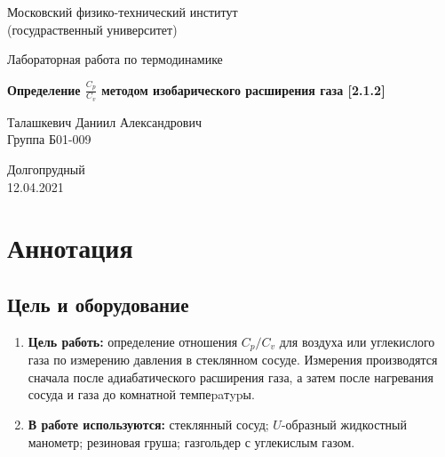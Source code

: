 \documentclass[a4paper,11.5pt]{article} %
\begin{document}


\begin{titlepage}

	\newpage
	\begin{center}
		\normalsize Московский физико-технический институт \\(госудраственный 			университет)
	\end{center}

	\vspace{6em}

	\begin{center}
		\Large Лабораторная работа по термодинамике\\
	\end{center}

	\vspace{1em}

	\begin{center}
		\large  \textbf{Определение $\frac{C_p}{C_v}$ методом изобарического расширения газа [2.1.2]}
	\end{center}

	\vspace{2em}

	\begin{center}
		\large Талашкевич Даниил Александрович\\
		Группа Б01-009
	\end{center}

	\vspace{\fill}

	\begin{center}
	Долгопрудный \\12.04.2021
	\end{center}
	
\end{titlepage}



	\thispagestyle{empty}
	\newpage
	\tableofcontents
	\newpage
	\setcounter{page}{1}


\section{Аннотация}

\subsection{Цель и оборудование}
\begin{enumerate}
\item \textbf{Цель работь:} определение отношения $C_{p} / C_{v}$ для воздуха или углекислого газа по измерению давления в стеклянном сосуде. Измерения производятся сначала после адиабатического расширения газа, а затем после нагревания сосуда и газа до комнатной темпеpaтypы.

\item \textbf{В работе используются:} стеклянный сосуд; $U$-образный жидкостный манометр; резиновая груша; газгольдер с углекислым газом.
\end{enumerate}
\end{document}
